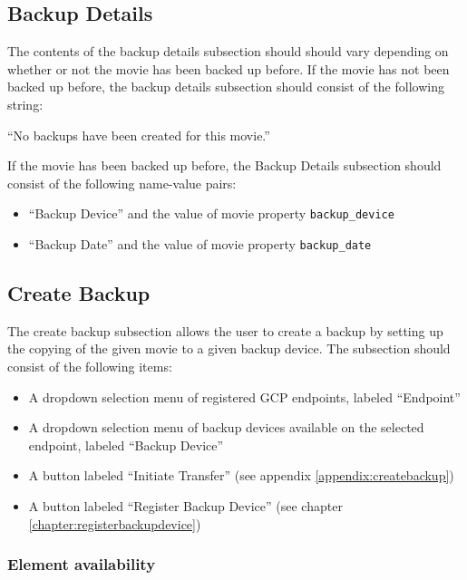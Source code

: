 \subsection{Backup Details}

The contents of the backup details subsection should should vary depending on 
whether or not the movie has been backed up before. If the movie has not been 
backed up before, the backup details subsection should consist of the following
string: 

\vspace{3mm}
``No backups have been created for this movie.''
\vspace{3mm}

\noindent If the movie has been backed up before, the Backup Details subsection
should consist of the following name-value pairs:

\begin{itemize}\itemsep1pt
  \item ``Backup Device'' and the value of movie property \texttt{backup\_device}
  \item ``Backup Date'' and the value of movie property \texttt{backup\_date}
\end{itemize}

\subsection{Create Backup}

The create backup subsection allows the user to create a backup by setting up the
copying of the given movie to a given backup device. The subsection should consist 
of the following items:

\begin{itemize}\itemsep1pt
  \item A dropdown selection menu of registered GCP endpoints, labeled ``Endpoint''
  \item A dropdown selection menu of backup devices available on the selected 
  endpoint, labeled ``Backup Device''
  \item A button labeled ``Initiate Transfer'' (see appendix 
  \ref{appendix:createbackup})
  \item A button labeled ``Register Backup Device'' (see chapter 
  \ref{chapter:registerbackupdevice})
\end{itemize}

\subsubsection{Element availability}

